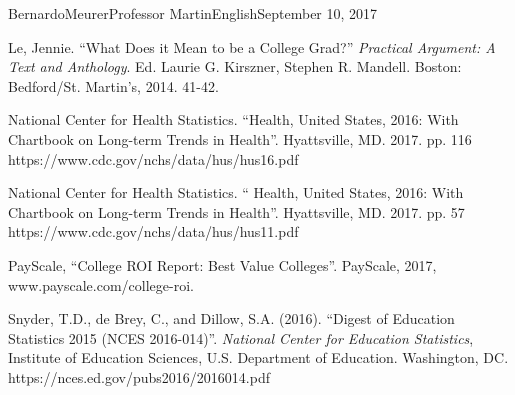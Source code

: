 \documentclass[12pt,letterpaper]{article}
\begin{document}
\begin{mla}{Bernardo}{Meurer}{Professor Martin}{English}{September 10, 2017}
\begin{workscited}
    \bibent
    Le, Jennie. ``What Does it Mean to be a College Grad?'' \textit{Practical Argument: A Text and Anthology}. Ed. Laurie G. Kirszner, Stephen R. Mandell. Boston: Bedford/St. Martin’s, 2014. 41-42.

    \bibent
    National Center for Health Statistics. ``Health, United States, 2016: With Chartbook on Long-term Trends in Health''. Hyattsville, MD. 2017. pp. 116 https://www.cdc.gov/nchs/data/hus/hus16.pdf
    
    \bibent
    National Center for Health Statistics. `` Health, United States, 2016: With Chartbook on Long-term Trends in Health''. Hyattsville, MD. 2017. pp. 57 https://www.cdc.gov/nchs/data/hus/hus11.pdf

    \bibent
    PayScale, ``College ROI Report: Best Value Colleges''. PayScale, 2017, www.payscale.com/college-roi. 

    \bibent
    Snyder, T.D., de Brey, C., and Dillow, S.A. (2016). ``Digest of Education Statistics 2015 (NCES 2016-014)''. \textit{National Center for Education Statistics}, Institute of Education Sciences, U.S. Department of Education. Washington, DC. https://nces.ed.gov/pubs2016/2016014.pdf
    \end{workscited}
    \end{mla}
    
\end{document}
